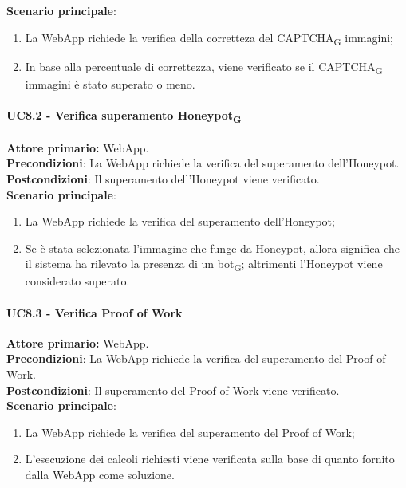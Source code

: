 \textbf{Scenario principale}:
\begin{enumerate}
    \item La WebApp richiede la verifica della corretteza del CAPTCHA\textsubscript{G} immagini;
    \item In base alla percentuale di correttezza, viene verificato se il CAPTCHA\textsubscript{G} immagini è stato superato o meno.
\end{enumerate}

\paragraph{UC8.2 - Verifica superamento Honeypot\textsubscript{G}}
\textbf{Attore primario:} WebApp.\\
\textbf{Precondizioni}: La WebApp richiede la verifica del superamento dell'Honeypot.\\
\textbf{Postcondizioni}: Il superamento dell'Honeypot viene verificato.\\

\textbf{Scenario principale}:
\begin{enumerate}
    \item La WebApp richiede la verifica del superamento dell'Honeypot;
    \item Se è stata selezionata l'immagine che funge da Honeypot, allora significa che il sistema ha rilevato la presenza di un bot\textsubscript{G}; altrimenti l'Honeypot viene considerato superato.
\end{enumerate}

\paragraph{UC8.3 - Verifica Proof of Work}
\textbf{Attore primario:} WebApp.\\
\textbf{Precondizioni}: La WebApp richiede la verifica del superamento del Proof of Work.\\
\textbf{Postcondizioni}: Il superamento del Proof of Work viene verificato.\\

\textbf{Scenario principale}:
\begin{enumerate}
    \item La WebApp richiede la verifica del superamento del Proof of Work;
    \item L'esecuzione dei calcoli richiesti viene verificata sulla base di quanto fornito dalla WebApp come soluzione.
\end{enumerate}

